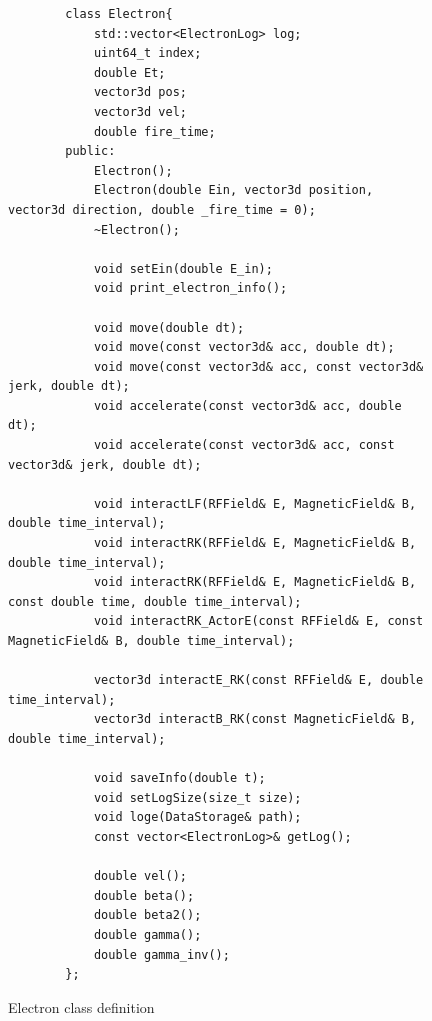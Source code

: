 \documentclass[a4paper,oneside,12pt]{report}
\numberwithin{equation}{chapter}
\begin{document}
\begin{figure}[H]
    \centering
    \captionsetup{justification=centering}
    \begin{verbatim}
        class Electron{
            std::vector<ElectronLog> log;
            uint64_t index;
            double Et;
            vector3d pos;
            vector3d vel;
            double fire_time;
        public:
            Electron();
            Electron(double Ein, vector3d position, vector3d direction, double _fire_time = 0);
            ~Electron();

            void setEin(double E_in);
            void print_electron_info();

            void move(double dt);
            void move(const vector3d& acc, double dt);
            void move(const vector3d& acc, const vector3d& jerk, double dt);
            void accelerate(const vector3d& acc, double dt);
            void accelerate(const vector3d& acc, const vector3d& jerk, double dt);
            
            void interactLF(RFField& E, MagneticField& B, double time_interval);
            void interactRK(RFField& E, MagneticField& B, double time_interval);
            void interactRK(RFField& E, MagneticField& B, const double time, double time_interval);
            void interactRK_ActorE(const RFField& E, const MagneticField& B, double time_interval);

            vector3d interactE_RK(const RFField& E, double time_interval);
            vector3d interactB_RK(const MagneticField& B, double time_interval);

            void saveInfo(double t);
            void setLogSize(size_t size);
            void loge(DataStorage& path);
            const vector<ElectronLog>& getLog();

            double vel();
            double beta();
            double beta2();
            double gamma();
            double gamma_inv();
        };
    \end{verbatim}
    \caption{Electron class definition}
    \label{fig:e_class}
\end{figure}
\end{document}
